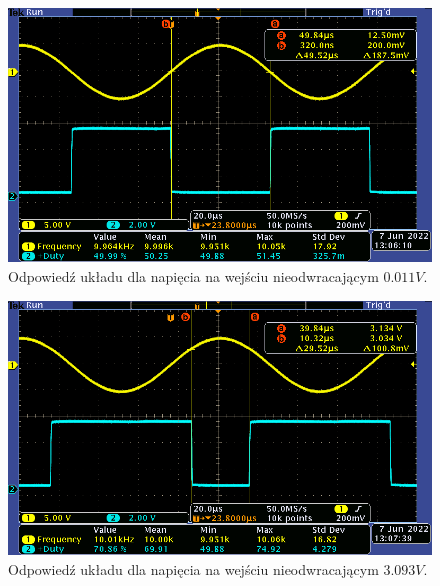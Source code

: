 \begin{figure}[H]
    \centering
    \includegraphics[width=\textwidth]{include/1/3.png}
    \caption{Odpowiedź układu dla napięcia na wejściu nieodwracającym \(0.011V\).}
\end{figure}

\begin{figure}[H]
    \centering
    \includegraphics[width=\textwidth]{include/1/4.png}
    \caption{Odpowiedź układu dla napięcia na wejściu nieodwracającym \(3.093V\).}
\end{figure}
